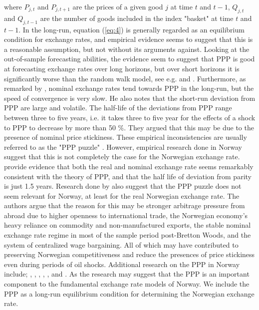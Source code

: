 \documentclass[10pt]{article}
\numberwithin{equation}{section}
\numberwithin{table}{section}
\numberwithin{figure}{section}
\begin{document}
\begin{spacing}{1.5}
where $P_{j,t}$ and $P_{j,t+1}$ are the prices of a given good $j$ at time $t$ and $t-1$, $Q_{j,t}$ and $Q_{j,t-1}$ are the number of goods included in the index "basket" at time $t$ and $t-1$. In the long-run, equation (\ref{eq:4}) is generally regarded as an equilibrium condition for exchange rates, and empirical evidence seems to suggest that this is a reasonable assumption, but not without its arguments against. Looking at the out-of-sample forecasting abilities, the evidence seem to suggest that PPP is good at forecasting exchange rates over long horizons, but over short horizons it is significantly worse than the random walk model, see e.g. \cite{sarno2002economics} and \cite{cheung2005empirical}. Furthermore, as remarked by \cite{rogoff1996purchasing}, nominal exchange rates tend towards PPP in the long-run, but the speed of convergence is very slow. He also notes that the short-run deviation from PPP are large and volatile. The half-life of the deviations from PPP range between three to five years, i.e. it takes three to five year for the effects of a shock to PPP to decrease by more than 50 \%. They argued that this may be due to the presence of nominal price stickiness. These empirical inconsistencies are usually referred to as the "PPP puzzle" \citep[p.647]{rogoff1996purchasing}. However, empirical research done in Norway suggest that this is not completely the case for the Norwegian exchange rate. \cite{akram2002ppp,akram2006ppp} provide evidence that both the real and nominal exchange rate seems remarkably consistent with the theory of PPP, and that the half life of deviation from parity is just 1.5 years. Research done by \cite{nordbo2004ppp} also suggest that the PPP puzzle does not seem relevant for Norway, at least for the real Norwegian exchange rate. The authors argue that the reason for this may be stronger arbitrage pressure from abroad due to higher openness to international trade, the Norwegian economy's heavy reliance on commodity and non-manufactured exports, the stable nominal exchange rate regime in most of the sample period post-Bretton Woods, and the system of centralized wage bargaining. All of which may have contributed to preserving Norwegian competitiveness and reduce the presences of price stickiness even during periods of oil shocks. Additional research on the PPP in Norway include; \cite{edison1987quantitative}, \cite{jore1998testing}, \cite{bjornland2002fundamental,bjornland2005commodity,bjornland2006importance}, \cite{bjornstad2005commodity}, \cite{bjornland2008monetary}, \cite{alstad2010long} and \cite{papadamou2012monetary}. As the research may suggest that the PPP is an important component to the fundamental exchange rate models of Norway. We include the PPP as a long-run equilibrium condition for determining the Norwegian exchange rate.  

\end{spacing}
\end{document}
